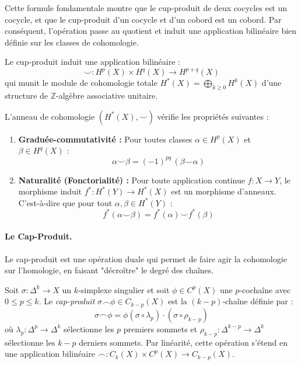 Cette formule fondamentale montre que le cup-produit de deux cocycles est un cocycle, et que le cup-produit d'un cocycle et d'un cobord est un cobord. Par conséquent, l'opération passe au quotient et induit une application bilinéaire bien définie sur les classes de cohomologie.

\begin{definition}
Le cup-produit induit une application bilinéaire :
\[
\smile : H^p(X) \times H^q(X) \longrightarrow H^{p+q}(X)
\]
qui munit le module de cohomologie totale $H^*(X) = \bigoplus_{k \geq 0} H^k(X)$ d'une structure de $\mathbb{Z}$-algèbre associative unitaire.
\end{definition}

\begin{proposition}
L'anneau de cohomologie $(H^*(X), \smile)$ vérifie les propriétés suivantes :
\begin{enumerate}
    \item \textbf{Graduée-commutativité :} Pour toutes classes $\alpha \in H^p(X)$ et $\beta \in H^q(X)$ :
    \[
    \alpha \smile \beta = (-1)^{pq} \, (\beta \smile \alpha)
    \]
    \item \textbf{Naturalité (Fonctorialité) :} Pour toute application continue $f : X \to Y$, le morphisme induit $f^* : H^*(Y) \to H^*(X)$ est un morphisme d'anneaux. C'est-à-dire que pour tout $\alpha, \beta \in H^*(Y)$ :
    \[
    f^*(\alpha \smile \beta) = f^*(\alpha) \smile f^*(\beta)\]
    \end{enumerate}
\end{proposition}

\paragraph{Le Cap-Produit.}

Le cap-produit est une opération duale qui permet de faire agir la cohomologie sur l'homologie, en faisant "décroître" le degré des chaînes.

\begin{definition}
Soit $\sigma : \Delta^k \to X$ un $k$-simplexe singulier et soit $\phi \in C^p(X)$ une $p$-cochaîne avec $0 \leq p \leq k$. Le \emph{cap-produit} $\sigma \frown \phi \in C_{k-p}(X)$ est la $(k-p)$-chaîne définie par :
\[
\sigma \frown \phi = \phi(\sigma \circ \lambda_p) \cdot (\sigma \circ \rho_{k-p})
\]
où $\lambda_p : \Delta^p \to \Delta^k$ sélectionne les $p$ premiers sommets et $\rho_{k-p} : \Delta^{k-p} \to \Delta^k$ sélectionne les $k-p$ derniers sommets. Par linéarité, cette opération s'étend en une application bilinéaire $\frown : C_k(X) \times C^p(X) \to C_{k-p}(X)$.
\end{definition}

